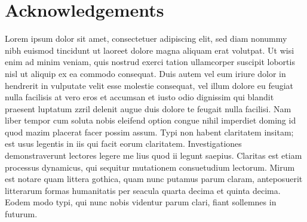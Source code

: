 \documentclass[final,3p,times,twocolumn]{elsarticle}
\begin{document}
\section*{Acknowledgements}
Lorem ipsum dolor sit amet, consectetuer adipiscing elit, sed diam nonummy nibh euismod tincidunt ut laoreet dolore magna aliquam erat volutpat. Ut wisi enim ad minim veniam, quis
nostrud exerci tation ullamcorper suscipit lobortis nisl ut aliquip ex ea commodo consequat. Duis autem vel eum iriure dolor in hendrerit in vulputate velit esse molestie consequat,
vel illum dolore eu feugiat nulla facilisis at vero eros et accumsan et iusto odio dignissim qui blandit praesent luptatum zzril delenit augue duis dolore te feugait nulla facilisi.
Nam liber tempor cum soluta nobis eleifend option congue nihil imperdiet doming id quod mazim placerat facer possim assum. Typi non habent claritatem insitam; est usus legentis in
iis qui facit eorum claritatem. Investigationes demonstraverunt lectores legere me lius quod ii legunt saepius. Claritas est etiam processus dynamicus, qui sequitur mutationem
consuetudium lectorum. Mirum est notare quam littera gothica, quam nunc putamus parum claram, anteposuerit litterarum formas humanitatis per seacula quarta decima et quinta
decima. Eodem modo typi, qui nunc nobis videntur parum clari, fiant sollemnes in futurum.

\begin{thebibliography}{00}
\end{thebibliography}
  
\end{document}
